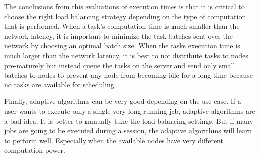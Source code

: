 \documentclass[12pt]{article}
\begin{document}
The conclusions from this evaluations of execution times is that it is critical to choose the right load balancing strategy depending on the type of computation that is performed. When a task's computation time is much smaller than the network latency, it is important to minimize the task batches sent over the network by choosing an optimal batch size. When the tasks execution time is much larger than the network latency, it is best to not distribute tasks to nodes pre-maturely but instead queue the tasks on the server and send only small batches to nodes to prevent any node from becoming idle for a long time because no tasks are available for scheduling.

Finally, adaptive algorithms can be very good depending on the use case. If a user wants to execute only a single very long running job, adaptive algorithms are a bad idea. It is better to manually tune the load balancing settings. But if many jobs are going to be executed during a session, the adaptive algorithms will learn to perform well. Especially when the available nodes have very different computation power.

\newpage

\appendix


\end{document}
